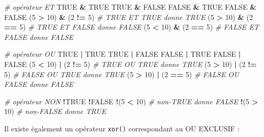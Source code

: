 \documentclass[
]{book}
\newenvironment{Shaded}{\begin{snugshade}}{\end{snugshade}}
\newcommand{\CommentTok}[1]{\textcolor[rgb]{0.56,0.35,0.01}{\textit{#1}}}
\newcommand{\ConstantTok}[1]{\textcolor[rgb]{0.56,0.35,0.01}{#1}}
\newcommand{\DecValTok}[1]{\textcolor[rgb]{0.00,0.00,0.81}{#1}}
\newcommand{\NormalTok}[1]{#1}
\newcommand{\SpecialCharTok}[1]{\textcolor[rgb]{0.81,0.36,0.00}{\textbf{#1}}}
\begin{document}
\begin{Shaded}
\begin{Highlighting}[]
\CommentTok{\# opérateur ET}
\ConstantTok{TRUE} \SpecialCharTok{\&} \ConstantTok{TRUE}
\ConstantTok{TRUE} \SpecialCharTok{\&} \ConstantTok{FALSE}
\ConstantTok{FALSE} \SpecialCharTok{\&} \ConstantTok{TRUE}
\ConstantTok{FALSE} \SpecialCharTok{\&} \ConstantTok{FALSE}
\NormalTok{(}\DecValTok{5} \SpecialCharTok{\textgreater{}} \DecValTok{10}\NormalTok{) }\SpecialCharTok{\&}\NormalTok{ (}\DecValTok{2} \SpecialCharTok{!=} \DecValTok{5}\NormalTok{) }\CommentTok{\# TRUE ET TRUE donne TRUE}
\NormalTok{(}\DecValTok{5} \SpecialCharTok{\textgreater{}} \DecValTok{10}\NormalTok{) }\SpecialCharTok{\&}\NormalTok{ (}\DecValTok{2} \SpecialCharTok{==} \DecValTok{5}\NormalTok{) }\CommentTok{\# TRUE ET FALSE donne FALSE}
\NormalTok{(}\DecValTok{5} \SpecialCharTok{\textless{}} \DecValTok{10}\NormalTok{) }\SpecialCharTok{\&}\NormalTok{ (}\DecValTok{2} \SpecialCharTok{==} \DecValTok{5}\NormalTok{) }\CommentTok{\# FALSE ET FALSE donne FALSE}

\CommentTok{\# opérateur OU}
\ConstantTok{TRUE} \SpecialCharTok{|} \ConstantTok{TRUE}
\ConstantTok{TRUE} \SpecialCharTok{|} \ConstantTok{FALSE}
\ConstantTok{FALSE} \SpecialCharTok{|} \ConstantTok{TRUE}
\ConstantTok{FALSE} \SpecialCharTok{|} \ConstantTok{FALSE}
\NormalTok{(}\DecValTok{5} \SpecialCharTok{\textless{}} \DecValTok{10}\NormalTok{) }\SpecialCharTok{|}\NormalTok{ (}\DecValTok{2} \SpecialCharTok{!=} \DecValTok{5}\NormalTok{) }\CommentTok{\# TRUE OU TRUE donne TRUE}
\NormalTok{(}\DecValTok{5} \SpecialCharTok{\textgreater{}} \DecValTok{10}\NormalTok{) }\SpecialCharTok{|}\NormalTok{ (}\DecValTok{2} \SpecialCharTok{!=} \DecValTok{5}\NormalTok{) }\CommentTok{\# FALSE OU TRUE donne TRUE}
\NormalTok{(}\DecValTok{5} \SpecialCharTok{\textgreater{}} \DecValTok{10}\NormalTok{) }\SpecialCharTok{|}\NormalTok{ (}\DecValTok{2} \SpecialCharTok{==} \DecValTok{5}\NormalTok{) }\CommentTok{\# FALSE OU FALSE donne FALSE}

\CommentTok{\# opérateur NON}
\SpecialCharTok{!}\ConstantTok{TRUE}
\SpecialCharTok{!}\ConstantTok{FALSE}
\SpecialCharTok{!}\NormalTok{(}\DecValTok{5} \SpecialCharTok{\textless{}} \DecValTok{10}\NormalTok{) }\CommentTok{\# non{-}TRUE donne FALSE}
\SpecialCharTok{!}\NormalTok{(}\DecValTok{5} \SpecialCharTok{\textgreater{}} \DecValTok{10}\NormalTok{) }\CommentTok{\# non{-}FALSE donne TRUE }
\end{Highlighting}
\end{Shaded}

Il existe également un opérateur \texttt{xor()} correspondant au OU EXCLUSIF :
\end{document}
